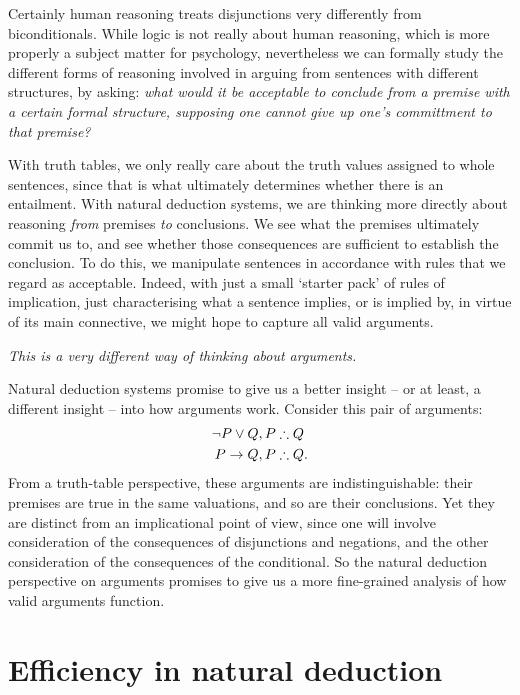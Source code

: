 Certainly human reasoning treats disjunctions very differently from biconditionals. While logic is not really about human reasoning, which is more properly a subject matter for psychology, nevertheless we can formally study the different forms of reasoning involved in arguing from sentences with different structures, by asking: \emph{what would it be acceptable to conclude from a premise with a certain formal structure, supposing one cannot give up one's committment to that premise?} 


With truth tables, we only really care about the truth values assigned to whole sentences, since that is what ultimately determines whether there is an entailment. With natural deduction systems, we are thinking more directly about reasoning \emph{from} premises \emph{to} conclusions. We see what the premises ultimately commit us to, and see whether those consequences are sufficient to establish the conclusion. To do this, we manipulate sentences in accordance with rules that we regard as acceptable. Indeed, with just a small `starter pack' of rules of implication, just characterising what a sentence implies, or is implied by, in virtue of its main connective, we might hope to capture all valid arguments. 

\emph{This is a very different way of thinking about arguments.} 

Natural deduction systems promise to give us a better insight – or at least, a different insight – into how arguments work. Consider this pair of arguments:
	\begin{align*}
		\neg P \vee Q,  P & \mathrel{\therefore} Q\\
		P \rightarrow Q, P & \mathrel{\therefore} Q.
	\end{align*} From a truth-table perspective, these arguments are indistinguishable: their premises are true in the same valuations, and so are their conclusions. Yet they are distinct from an implicational point of view, since one will involve consideration of the consequences of disjunctions and negations, and the other consideration of the consequences of the conditional. So the natural deduction perspective on arguments promises to give us a more fine-grained analysis of how valid arguments function. 

\section{Efficiency in natural deduction} %
\label{sec:efficiency_in_natural_deduction}

